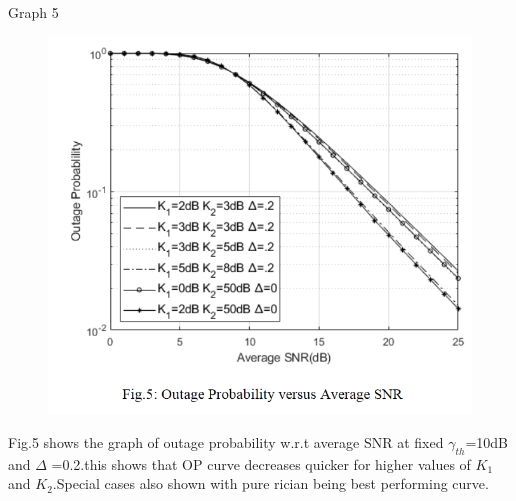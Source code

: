\documentclass{beamer}
\begin{document}
\begin{frame}
    \begin{block}{Graph 5}
     \begin{figure}
         \centering
         \includegraphics[width=0.5\columnwidth]{Figures/fig5.PNG}
         \label{fig:my_label}
     \end{figure}
     Fig.5  shows  the  graph  of  outage  probability  w.r.t  average  SNR  at  fixed \(\gamma_{th}\)=10dB and \(\Delta\) =0.2.this shows that OP curve decreases quicker for higher values of \(K_1\) and \(K_2\).Special cases also shown with pure rician being best performing curve.
\end{block}
\end{frame}
\end{document}
